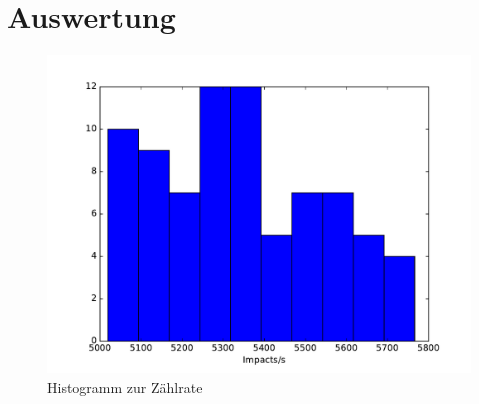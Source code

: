 \section{Auswertung}
\label{sec:Auswertung}

 \begin{figure}
   \centering
   \includegraphics{plots/Statistik.pdf}
   \caption{Histogramm zur Zählrate}
   \label{fig:plot}
 \end{figure}
